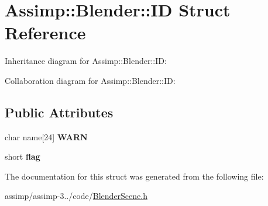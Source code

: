 \hypertarget{struct_assimp_1_1_blender_1_1_i_d}{\section{Assimp\+:\+:Blender\+:\+:I\+D Struct Reference}
\label{struct_assimp_1_1_blender_1_1_i_d}
}


Inheritance diagram for Assimp\+:\+:Blender\+:\+:I\+D\+:


Collaboration diagram for Assimp\+:\+:Blender\+:\+:I\+D\+:
\subsection*{Public Attributes}
\begin{DoxyCompactItemize}
\item 
\hypertarget{struct_assimp_1_1_blender_1_1_i_d_a8d8a8a48608fed1c373ac626ff54e06f}{char name\mbox{[}24\mbox{]} {\bfseries W\+A\+R\+N}}\label{struct_assimp_1_1_blender_1_1_i_d_a8d8a8a48608fed1c373ac626ff54e06f}

\item 
\hypertarget{struct_assimp_1_1_blender_1_1_i_d_a8086f198c6642a7aeed6cc7c541ce3ee}{short {\bfseries flag}}\label{struct_assimp_1_1_blender_1_1_i_d_a8086f198c6642a7aeed6cc7c541ce3ee}

\end{DoxyCompactItemize}


The documentation for this struct was generated from the following file\+:\begin{DoxyCompactItemize}
\item 
assimp/assimp-\/3../code/\hyperlink{_blender_scene_8h}{Blender\+Scene.\+h}\end{DoxyCompactItemize}
